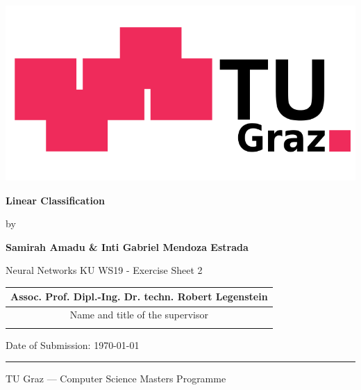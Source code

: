 \documentclass[a4paper,11pt,oneside]{article}
\newcommand{\myname}{Samirah Amadu \& Inti Gabriel Mendoza Estrada}
\newcommand{\mytitle}{Linear Classification}
\newcommand{\mysupervisor}{Assoc. Prof. Dipl.-Ing. Dr. techn. Robert Legenstein}
\begin{document}

  \thispagestyle{empty}

  \begin{flushright}
    \includegraphics[scale=0.25]{TU_Graz.png}
  \end{flushright}
  \vspace{20mm}
  \begin{center}
    \huge
    \textbf{\mytitle}
  \end{center}
  \vspace*{4mm}
  \begin{center}
   \Large by
  \end{center}
  \vspace*{4mm}
  \begin{center}
    \Large
    \textbf{\myname}
  \end{center}
  \vspace*{20mm}
  \begin{center}
    \large
    Neural Networks KU WS19 - Exercise Sheet 2
  \end{center}
  \vfill
  \begin{flushright}
    \large
    \begin{tabular}{c}
      \mysupervisor \\
      \hline
      Name and title of the supervisor \\
      \\
    \end{tabular}
  \end{flushright}
  \vspace*{8mm}
  \begin{flushleft}
    \large
    Date of Submission: \today \\
    \rule{\textwidth}{1pt}
  \end{flushleft}
  \begin{center}
    \Large TU Graz --- Computer Science Masters Programme
  \end{center}
\end{document}
